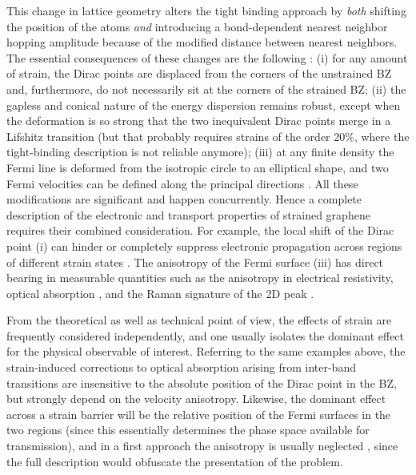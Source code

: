 This change in lattice geometry alters the tight binding approach by \emph{both} shifting the position of the atoms \emph{and}  introducing a bond-dependent nearest neighbor hopping amplitude \cite{Hasegawa2006} because of the modified distance between nearest neighbors.
The essential consequences of these changes are the following \cite{Pereira2009}:
(i) for any amount of strain, the Dirac points are displaced from the corners of the unstrained BZ and, furthermore, do not necessarily sit at the corners of the strained BZ;
(ii) the gapless and conical nature of the energy dispersion remains robust, except when the deformation is so strong that the two inequivalent Dirac points merge in a Lifshitz transition (but that probably requires strains of the order 20\%, where the tight-binding description is not reliable anymore);
(iii) at any finite density the Fermi line is deformed from the isotropic circle to an elliptical shape, and two Fermi velocities can be defined along the principal directions \cite{Pereira2009,Pereira2010c,Choi2010}.
All these modifications are significant and happen concurrently. 
Hence a complete description of the electronic and transport properties of strained graphene requires their combined consideration.
For example, the local shift of the Dirac point (i) can hinder or completely suppress electronic propagation across regions of different strain states \cite{Pereira2009a,Fogler2008}.
The anisotropy of the Fermi surface (iii) has direct bearing in measurable quantities such as the anisotropy in electrical resistivity\cite{Kim2009}, optical absorption \cite{Pereira2010c,Pellegrino2010}, and the Raman signature of the 2D peak \cite{Huang2010,Mohr2010a,Frank2011,Yoon2011}.

From the theoretical as well as technical point of view, the effects of strain are frequently considered independently, and one usually isolates the dominant effect for the physical observable of interest.
Referring to the same examples above, the strain-induced corrections to optical absorption arising from inter-band transitions are insensitive to the absolute position of the Dirac point in the BZ, but strongly depend on the velocity anisotropy\cite{Pereira2010c,Pellegrino2010}.
Likewise, the dominant effect across a strain barrier will be the relative position of the Fermi surfaces in the two regions (since this essentially determines the phase space available for transmission), and in a first approach the anisotropy is usually neglected \cite{Fogler2008,Pereira2009a}, since the full description would obfuscate the presentation of the problem.

